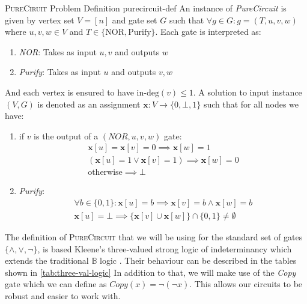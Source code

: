 \begin{definitionbox}{\textsc{PureCiruit} Problem Definition \cite{deligkas_PureCircuitTightInapproximability_2024}}{purecircuit-def}
An instance of \textit{PureCircuit} is given by vertex set $V= [n]$ and gate set $G$ such that
$\forall g \in G: g=(T,u,v,w)$ where $u,v,w \in V$ and $T \in \{\text{NOR}, \text{Purify}\}$.
Each gate is interpreted as:
\begin{enumerate}
    \item \textit{NOR}: Takes as input $u,v$ and outputs $w$
    \item \textit{Purify}: Takes as input $u$ and outputs $v,w$
\end{enumerate}
And each vertex is ensured to have $\text{in-deg}(v) \leq 1$.
A solution to input instance $(V,G)$ is denoted as an assignment $\mathbf{x} : V \to \{0, \bot, 1\}$
such that for all nodes we have:
\begin{enumerate}
    \item if $v$ is the output of a $(\textit{NOR}, u,v,w)$ gate:
       \begin{gather*}
            \mathbf{x}[u] = \mathbf{x}[v] = 0 \implies \mathbf{x}[w] = 1\\
            (\mathbf{x}[u] =1 \vee \mathbf{x}[v] =1) \implies \mathbf{x}[w] = 0 \\
            \text{otherwise} \implies \bot
        \end{gather*}

    \item \textit{Purify}: 
       \begin{gather*}
           \forall b \in \{0,1\}: \mathbf{x}[u] = b \implies \mathbf{x}[v] = b \wedge \mathbf{x}[w] =  b\\
           \mathbf{x}[u] = \bot \implies \{\mathbf{x}[v] \cup \mathbf{x}[w] \} \cap \{0,1\} \neq \emptyset
        \end{gather*}
\end{enumerate}
\end{definitionbox}

The definition of \textsc{PureCircuit} that we will be using for the standard set of gates
$\{\wedge, \vee, \neg\}$, is based Kleene's three-valued strong logic of indeterminancy
which extends the traditional $\mathbb{B}$ logic \cite{kleene_IntroductionMetamathematics_2009}.
Their behaviour can be described in the tables shown in \ref{tab:three-val-logic}
In addition to that, we will make use of the \textit{Copy} gate which we can define as $\textit{Copy}(x) = \neg (\neg x)$.
This allows our circuits to be robust and easier to work with.

